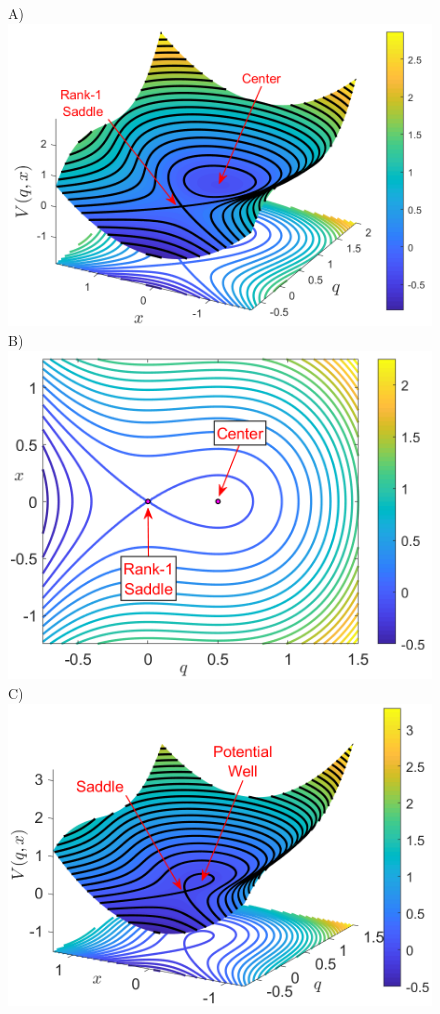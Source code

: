 \documentclass[8pt]{article}
\begin{document}
\begin{figure}[htbp]
	\begin{center}
		A)\includegraphics[scale=0.25]{fig6a.png}
		B)\includegraphics[scale=0.23]{fig6b.png}
		C)\includegraphics[scale=0.25]{fig6c.png}

\end{center}
\end{figure}
\end{document}
